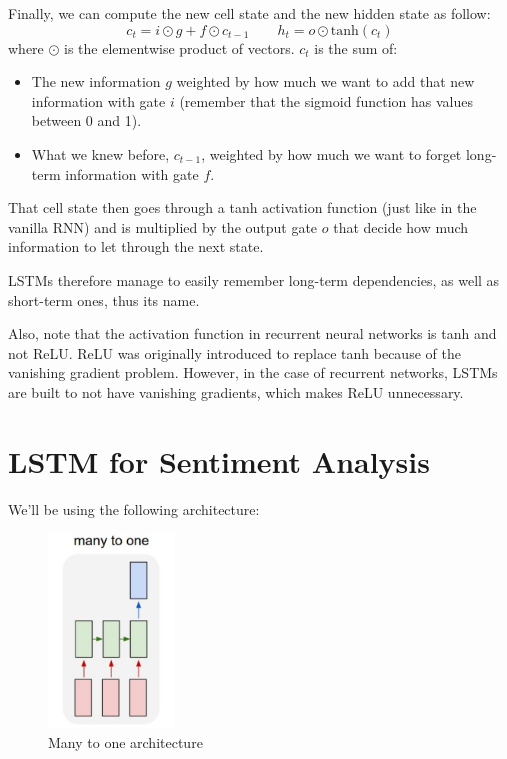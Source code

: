 Finally, we can compute the new cell state and the new hidden state as follow:
\begin{equation}
     c_t = i\odot g + f\odot c_{t-1} \qquad h_t = o\odot \text{tanh}(c_t)
\end{equation}
where $\odot$ is the elementwise product of vectors.
$c_t$ is the sum of:
\begin{itemize}
    \item The new information $g$ weighted by how much we want to add that new information with gate $i$ (remember that the sigmoid function has values between 0 and 
    1).
    \item What we knew before, $c_{t-1}$, weighted by how much we want to forget long-term information with gate $f$.
\end{itemize} 
That cell state then goes through a tanh activation function (just like in the vanilla RNN) and is multiplied by the output gate $o$ that decide how much information to let through the next state. 

LSTMs therefore manage to easily remember long-term dependencies, as well as short-term ones, thus its name.

Also, note that the activation function in recurrent neural networks is tanh and not ReLU. ReLU was originally introduced to replace tanh because of the vanishing gradient problem. However, in the case of recurrent networks, LSTMs are built to not have vanishing gradients, which makes ReLU unnecessary.

\newpage
\section{LSTM for Sentiment Analysis}
We'll be using the following architecture:

\begin{figure}[H]
    \centering
    \includegraphics[width=0.3\textwidth]{Images/many-to-one.png}
    \caption{Many to one architecture}
\end{figure}

